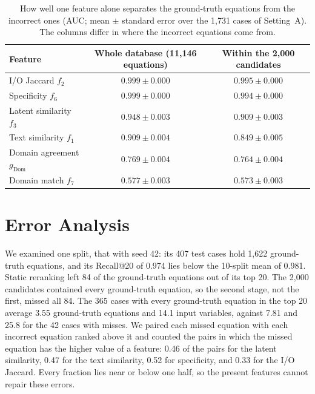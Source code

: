 \begin{table}[h]\centering
\caption{How well one feature alone separates the ground-truth equations from the incorrect ones
(AUC; mean $\pm$ standard error over the 1,731 cases of Setting~A). The columns differ in where the
incorrect equations come from.}
\label{tab:auc}
\small
\begin{tabular}{lcc}
\toprule
Feature & Whole database (11,146 equations) & Within the 2,000 candidates \\
\midrule
I/O Jaccard $f_2$ & $0.999 \pm 0.000$ & $0.995 \pm 0.000$ \\
Specificity $f_6$ & $0.999 \pm 0.000$ & $0.994 \pm 0.000$ \\
Latent similarity $f_3$ & $0.948 \pm 0.003$ & $0.909 \pm 0.003$ \\
Text similarity $f_1$ & $0.909 \pm 0.004$ & $0.849 \pm 0.005$ \\
Domain agreement $g_{\mathrm{Dom}}$ & $0.769 \pm 0.004$ & $0.764 \pm 0.004$ \\
Domain match $f_7$ & $0.577 \pm 0.003$ & $0.573 \pm 0.003$ \\
\bottomrule
\end{tabular}
\end{table}

\section{Error Analysis}
\label{sec:erroranalysis}

We examined one split, that with seed 42: its 407 test cases hold 1,622 ground-truth equations,
and its Recall@20 of 0.974 lies below the 10-split mean of 0.981. Static reranking left 84 of the
ground-truth equations out of its top 20. The 2,000 candidates contained every ground-truth
equation, so the second stage, not the first, missed all 84. The 365 cases with every ground-truth
equation in the top 20 average 3.55 ground-truth equations and 14.1 input variables, against 7.81
and 25.8 for the 42 cases with misses. We paired each missed equation with each incorrect equation
ranked above it and counted the pairs in which the missed equation has the higher value of a
feature: 0.46 of the pairs for the latent similarity, 0.47 for the text similarity, 0.52 for
specificity, and 0.33 for the I/O Jaccard. Every fraction lies near or below one half, so the
present features cannot repair these errors.

